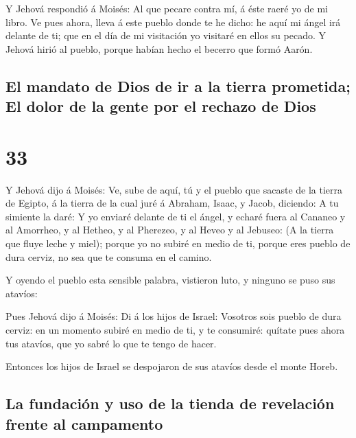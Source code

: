  Y Jehová respondió á Moisés: Al que pecare contra mí, á
éste raeré yo de mi libro.  Ve pues ahora, lleva á este
pueblo donde te he dicho: he aquí mi ángel irá delante de ti; que en el
día de mi visitación yo visitaré en ellos su pecado.  Y
Jehová hirió al pueblo, porque habían hecho el becerro que formó Aarón.

\hypertarget{el-mandato-de-dios-de-ir-a-la-tierra-prometida-el-dolor-de-la-gente-por-el-rechazo-de-dios}{%
\subsection{El mandato de Dios de ir a la tierra prometida; El dolor de
la gente por el rechazo de
Dios}\label{el-mandato-de-dios-de-ir-a-la-tierra-prometida-el-dolor-de-la-gente-por-el-rechazo-de-dios}}

\hypertarget{section-32}{%
\section{33}\label{section-32}}

 Y Jehová dijo á Moisés: Ve, sube de aquí, tú y el pueblo
que sacaste de la tierra de Egipto, á la tierra de la cual juré á
Abraham, Isaac, y Jacob, diciendo: A tu simiente la daré: 
Y yo enviaré delante de ti el ángel, y echaré fuera al Cananeo y al
Amorrheo, y al Hetheo, y al Pherezeo, y al Heveo y al Jebuseo:
 (A la tierra que fluye leche y miel); porque yo no subiré
en medio de ti, porque eres pueblo de dura cerviz, no sea que te consuma
en el camino.

 Y oyendo el pueblo esta sensible palabra, vistieron luto,
y ninguno se puso sus atavíos:

 Pues Jehová dijo á Moisés: Di á los hijos de Israel:
Vosotros sois pueblo de dura cerviz: en un momento subiré en medio de
ti, y te consumiré: quítate pues ahora tus atavíos, que yo sabré lo que
te tengo de hacer.

 Entonces los hijos de Israel se despojaron de sus atavíos
desde el monte Horeb.

\hypertarget{la-fundaciuxf3n-y-uso-de-la-tienda-de-revelaciuxf3n-frente-al-campamento}{%
\subsection{La fundación y uso de la tienda de revelación frente al
campamento}\label{la-fundaciuxf3n-y-uso-de-la-tienda-de-revelaciuxf3n-frente-al-campamento}}

